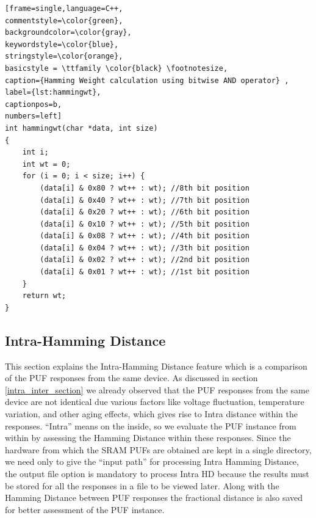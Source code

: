 \begin{center}
\begin{minipage}{0.7\textwidth}
\begin{lstlisting}[frame=single,language=C++,
commentstyle=\color{green},
backgroundcolor=\color{gray},
keywordstyle=\color{blue},
stringstyle=\color{orange},
basicstyle = \ttfamily \color{black} \footnotesize,
caption={Hamming Weight calculation using bitwise AND operator} ,
label={lst:hammingwt},
captionpos=b,
numbers=left]
int hammingwt(char *data, int size)
{
    int i;
    int wt = 0;
    for (i = 0; i < size; i++) {
        (data[i] & 0x80 ? wt++ : wt); //8th bit position
        (data[i] & 0x40 ? wt++ : wt); //7th bit position
        (data[i] & 0x20 ? wt++ : wt); //6th bit position
        (data[i] & 0x10 ? wt++ : wt); //5th bit position
        (data[i] & 0x08 ? wt++ : wt); //4th bit position
        (data[i] & 0x04 ? wt++ : wt); //3th bit position
        (data[i] & 0x02 ? wt++ : wt); //2nd bit position
        (data[i] & 0x01 ? wt++ : wt); //1st bit position
    }
    return wt;
}
\end{lstlisting}
\end{minipage}
\end{center}

\subsection{Intra-Hamming Distance}
\label{intra_hd_section}
This section explains the Intra-Hamming Distance feature which is a comparison of the PUF responses from the same device. As discussed in section \ref{intra_inter_section} we already observed that the PUF responses from the same device are not identical due various factors like voltage fluctuation,  temperature variation, and other aging effects, which gives rise to Intra distance within the responses. ``Intra'' means on the inside, so we evaluate the PUF instance from within by assessing the Hamming Distance within
these responses. Since the hardware from which the SRAM PUFs are obtained are kept in a single directory, we need only to give the ``input path'' for processing Intra Hamming Distance, the output file option is mandatory to process Intra HD because the results must be stored for all the responses in a file to be viewed later. Along with the Hamming Distance between PUF responses the fractional distance is also saved for better assessment of the PUF instance.\\

